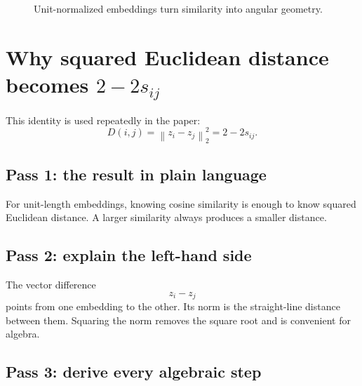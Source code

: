 \documentclass[11pt,oneside,openany]{book}
\theoremstyle{myplain}
\theoremstyle{definition}
\newcommand{\norm}[1]{\left\lVert #1\right\rVert}
\begin{document}
\begin{figure}[H]
\centering
{}
\caption{Unit-normalized embeddings turn similarity into angular geometry.}
\label{fig:unit-sphere}
\end{figure}

\section{Why squared Euclidean distance becomes $2-2s_{ij}$}

This identity is used repeatedly in the paper:
\begin{equation}
  \boxed{D(i,j)=\norm{z_i-z_j}_2^2=2-2s_{ij}.}
  \label{eq:cosdist}
\end{equation}

\subsection{Pass 1: the result in plain language}

For unit-length embeddings, knowing cosine similarity is enough to know squared Euclidean distance. A larger similarity always produces a smaller distance.

\subsection{Pass 2: explain the left-hand side}

The vector difference
\[
  z_i-z_j
\]
points from one embedding to the other. Its norm is the straight-line distance between them. Squaring the norm removes the square root and is convenient for algebra.

\subsection{Pass 3: derive every algebraic step}
\end{document}
